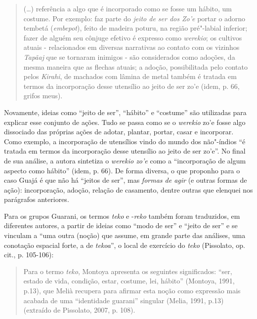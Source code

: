 \begin{quote}
(\ldots{}) referência a algo que é incorporado como se fosse um hábito,
um costume. Por exemplo: faz parte do \emph{jeito de ser dos Zo'e}
portar o adorno tembetá (\emph{embepot}), feito de madeira poturu, na
região pré"-labial inferior; fazer de alguém seu cônjuge efetivo é
expresso como \emph{werekio}; os cultivos atuais - relacionados em
diversas narrativas ao contato com os vizinhos \emph{Tapãaj} que se
tornaram inimigos - são considerados como adoções, da mesma maneira que
as flechas atuais; a adoção, possibilitada pelo contato pelos
\emph{Kirahi}, de machados com lâmina de metal também é tratada em
termos da incorporação desse utensílio ao jeito de ser zo'e (idem, p.
66, grifos meus).
\end{quote}

Novamente, ideias como ``jeito de ser'', ``hábito'' e ``costume'' são
utilizadas para explicar esse conjunto de ações. Tudo se passa como se o
\emph{werekio} zo'e fosse algo dissociado das próprias ações de adotar,
plantar, portar, casar e incorporar. Como exemplo, a incorporação de
utensílios vindo do mundo dos não"-índios ``é tratada em termos da
incorporação desse utensílio ao jeito de ser zo'e''. No final de sua
análise, a autora sintetiza o \emph{werekio zo'e} como a ``incorporação
de algum aspecto como hábito'' (idem, p. 66). De forma diversa, o que
proponho para o caso Guajá é que não há ``jeitos de ser'', mas
\emph{formas de agir} (e outras formas de ação): incorporação, adoção,
relação de casamento, dentre outras que elenquei nos parágrafos
anteriores.

Para os grupos Guarani, os termos \emph{teko} e -\emph{reko} também
foram traduzidos, em diferentes autores, a partir de ideias como ``modo
de ser'' e ``jeito de ser'' e se vinculam a ``uma outra (noção) que assume,
em grande parte das análises, uma conotação espacial forte, a de
\emph{tekoa}'', o local de exercício do \emph{teko} (Pissolato, op. cit.,
p. 105-106):

\begin{quote}
Para o termo \emph{teko}, Montoya apresenta os seguintes significados:
``ser, estado de vida, condição, estar, costume, lei, hábito'' (Montoya,
1991, p.13), que Melià recupera para afirmar esta noção como expressão
mais acabada de uma ``identidade guarani'' singular (Melia, 1991, p.13)
(extraído de Pissolato, 2007, p. 108).
\end{quote}

